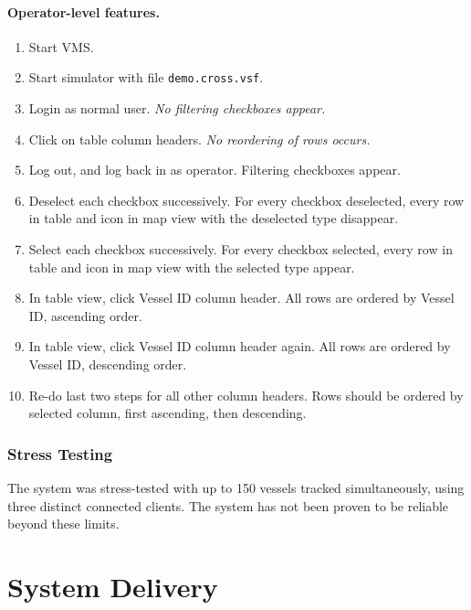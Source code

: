 \documentclass{article}
\begin{document}
\paragraph{Operator-level features.}
\begin{enumerate}
\item Start VMS.
\item Start simulator with file \verb|demo.cross.vsf|.
\item Login as normal user. \emph{No filtering checkboxes appear.}
\item Click on table column headers. \emph{No reordering of rows occurs.}
\item Log out, and log back in as operator. {Filtering checkboxes appear.}
\item Deselect each checkbox successively. {For every checkbox deselected, every row in table and icon in map view with the deselected type disappear.}
\item Select each checkbox successively. {For every checkbox selected, every row in table and icon in map view with the selected type appear.}
\item In table view, click Vessel ID column header. {All rows are ordered by Vessel ID, ascending order.}
\item In table view, click Vessel ID column header again. {All rows are ordered by Vessel ID, descending order.}
\item Re-do last two steps for all other column headers. {Rows should be ordered by selected column, first ascending, then descending.}
\end{enumerate}


\subsubsection{Stress Testing} %


The system was stress-tested with up to 150 vessels tracked simultaneously, using three distinct connected clients. The system has not been proven to be reliable beyond these limits.

\break

\section{System Delivery}
\end{document}
